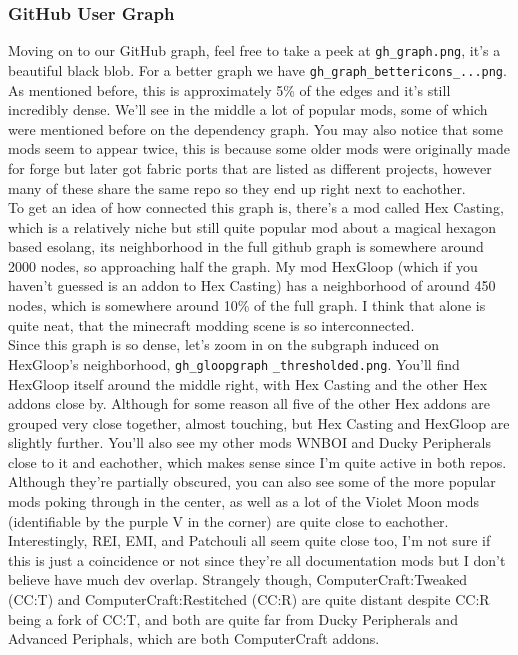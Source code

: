 \documentclass[a4paper,11pt, twocolumn]{article}
\begin{document}
\subsubsection{GitHub User Graph}

Moving on to our GitHub graph, feel free to take a peek at \verb|gh_graph.png|, it's a beautiful black blob. For a better graph we have \verb|gh_graph_bettericons_...png|. As mentioned before, this is approximately 5\% of the edges and it's still incredibly dense. We'll see in the middle a lot of popular mods, some of which were mentioned before on the dependency graph. You may also notice that some mods seem to appear twice, this is because some older mods were originally made for forge but later got fabric ports that are listed as different projects, however many of these share the same repo so they end up right next to eachother.\\

To get an idea of how connected this graph is, there's a mod called Hex Casting, which is a relatively niche but still quite popular mod about a magical hexagon based esolang, its neighborhood in the full github graph is somewhere around 2000 nodes, so approaching half the graph. My mod HexGloop (which if you haven't guessed is an addon to Hex Casting) has a neighborhood of around 450 nodes, which is somewhere around 10\% of the full graph. I think that alone is quite neat, that the minecraft modding scene is so interconnected.\\

Since this graph is so dense, let's zoom in on the subgraph induced on HexGloop's neighborhood, \verb|gh_gloopgraph| \verb|_thresholded.png|. You'll find HexGloop itself around the middle right, with Hex Casting and the other Hex addons close by. Although for some reason all five of the other Hex addons are grouped very close together, almost touching, but Hex Casting and HexGloop are slightly further. You'll also see my other mods WNBOI and Ducky Peripherals close to it and eachother, which makes sense since I'm quite active in both repos.\\

Although they're partially obscured, you can also see some of the more popular mods poking through in the center, as well as a lot of the Violet Moon mods (identifiable by the purple V in the corner) are quite close to eachother. Interestingly, REI, EMI, and Patchouli all seem quite close too, I'm not sure if this is just a coincidence or not since they're all documentation mods but I don't believe have much dev overlap. Strangely though, ComputerCraft:Tweaked (CC:T) and ComputerCraft:Restitched (CC:R) are quite distant despite CC:R being a fork of CC:T, and both are quite far from Ducky Peripherals and Advanced Periphals, which are both ComputerCraft addons.\\
\end{document}
